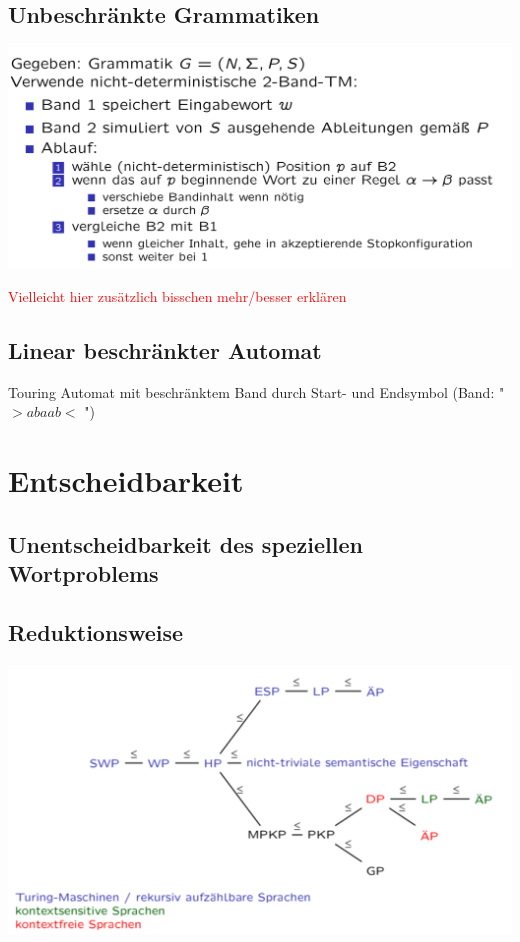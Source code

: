 \documentclass[12pt,a4paper]{article}
\begin{document}
	\subsection{Unbeschränkte Grammatiken}
	\begin{center}
		\includegraphics[width=\textwidth]{Bilder/Typ0Grammatik.png}
	\end{center}
	\textcolor{red}{Vielleicht hier zusätzlich bisschen mehr/besser erklären}

	\subsection{Linear beschränkter Automat}
		Touring Automat mit beschränktem Band durch Start- und Endsymbol (Band: " $>abaab<$ ")


\section{Entscheidbarkeit}
	\subsection{Unentscheidbarkeit des speziellen Wortproblems}

	\subsection{Reduktionsweise}
	\includegraphics[scale=0.4]{Bilder/Zusammenfassung_Unentscheidbarkeiten.png}
\end{document}
